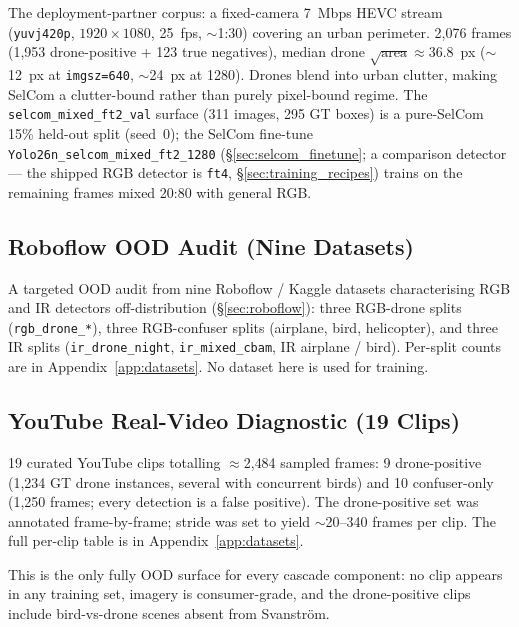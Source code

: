 The deployment-partner corpus: a fixed-camera 7~Mbps HEVC stream (\texttt{yuvj420p}, $1920{\times}1080$, 25~fps, $\sim$1:30) covering an urban perimeter. 2{,}076 frames (1{,}953 drone-positive + 123 true negatives), median drone $\sqrt{\text{area}} \approx 36.8$~px ($\sim$12~px at \texttt{imgsz=640}, $\sim$24~px at 1280). Drones blend into urban clutter, making SelCom a clutter-bound rather than purely pixel-bound regime. The \texttt{selcom\_mixed\_ft2\_val} surface (311 images, 295 GT boxes) is a pure-SelCom 15\% held-out split (seed~0); the SelCom fine-tune \texttt{Yolo26n\_selcom\_mixed\_ft2\_1280} (\S\ref{sec:selcom_finetune}; a comparison detector --- the shipped RGB detector is \texttt{ft4}, \S\ref{sec:training_recipes}) trains on the remaining frames mixed 20:80 with general RGB.

\subsection{Roboflow OOD Audit (Nine Datasets)}
\label{sec:ds_roboflow}

A targeted OOD audit from nine Roboflow / Kaggle datasets characterising RGB and IR detectors off-distribution (\S\ref{sec:roboflow}): three RGB-drone splits (\texttt{rgb\_drone\_*}), three RGB-confuser splits (airplane, bird, helicopter), and three IR splits (\texttt{ir\_drone\_night}, \texttt{ir\_mixed\_cbam}, IR airplane / bird). Per-split counts are in Appendix~\ref{app:datasets}. No dataset here is used for training.

\subsection{YouTube Real-Video Diagnostic (19 Clips)}
\label{sec:ds_youtube}

19 curated YouTube clips totalling $\approx$2{,}484 sampled frames: 9 drone-positive (1{,}234 GT drone instances, several with concurrent birds) and 10 confuser-only (1{,}250 frames; every detection is a false positive). The drone-positive set was annotated frame-by-frame; stride was set to yield $\sim$20--340 frames per clip. The full per-clip table is in Appendix~\ref{app:datasets}.

This is the only fully OOD surface for every cascade component: no clip appears in any training set, imagery is consumer-grade, and the drone-positive clips include bird-vs-drone scenes absent from Svanstr\"om.

